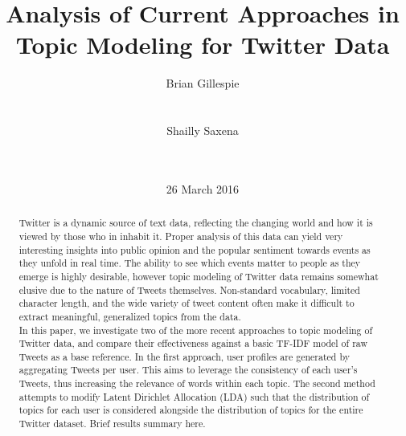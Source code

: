 \documentclass{acm_proc_article-sp}
\begin{document}
\title{Analysis of Current Approaches in Topic Modeling for Twitter Data}

\author{
\alignauthor
Brian Gillespie\\
       \\
       \\
\alignauthor
Shailly Saxena\\
       \\
       \\
}

\date{26 March 2016}


\maketitle
\begin{abstract}
\hspace*{5mm}Twitter is a dynamic source of text data, reflecting the changing world and how it is viewed by those who in inhabit it. Proper analysis of this data can yield very interesting insights into public opinion and the popular sentiment towards events as they unfold in real time. The ability to see which events matter to people as they emerge is highly desirable, however topic modeling of Twitter data remains somewhat elusive due to the nature of Tweets themselves. Non-standard vocabulary, limited character length, and the wide variety of tweet content often make it difficult to extract meaningful, generalized topics from the data. \\
\hspace*{5mm}In this paper, we investigate two of the more recent approaches to topic modeling of Twitter data, and compare their effectiveness against a basic TF-IDF model of raw Tweets as a base reference. In the first approach, user profiles are generated by aggregating Tweets per user. This aims to leverage the consistency of each user's Tweets, thus increasing the relevance of words within each topic. The second method attempts to modify Latent Dirichlet Allocation (LDA) such that the distribution of topics for each user is considered alongside the distribution of topics for the entire Twitter dataset. Brief results summary here. 
\end{abstract}

\end{document}
